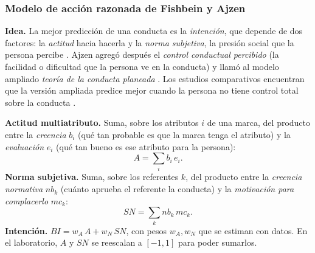 \subsubsection{Modelo de acción razonada de Fishbein y Ajzen}
\label{sec:cap09-fishbein}

\textbf{Idea.} La mejor predicción de una conducta es la \emph{intención}, que
depende de dos factores: la \emph{actitud} hacia hacerla y la \emph{norma
subjetiva}, la presión social que la persona percibe \parencite{fishbein1975}.
Ajzen agregó después el \emph{control conductual percibido} (la facilidad o
dificultad que la persona ve en la conducta) y llamó al modelo ampliado
\emph{teoría de la conducta planeada} \parencite{ajzen1991}. Los estudios
comparativos encuentran que la versión ampliada predice mejor cuando la
persona no tiene control total sobre la conducta \parencite{madden1992}.

\begin{cajaDefinicion}
\textbf{Actitud multiatributo.} Suma, sobre los atributos $i$ de una marca, del
producto entre la \emph{creencia} $b_i$ (qué tan probable es que la marca tenga
el atributo) y la \emph{evaluación} $e_i$ (qué tan bueno es ese atributo para la
persona):
\[
  A = \sum_i b_i\, e_i .
\]
\textbf{Norma subjetiva.} Suma, sobre los referentes $k$, del producto entre la
\emph{creencia normativa} $nb_k$ (cuánto aprueba el referente la conducta) y la
\emph{motivación para complacerlo} $mc_k$:
\[
  SN = \sum_k nb_k\, mc_k .
\]
\textbf{Intención.} $BI = w_A\,A + w_N\,SN$, con pesos $w_A, w_N$ que se
estiman con datos. En el laboratorio, $A$ y $SN$ se reescalan a $[-1,1]$ para
poder sumarlos.
\end{cajaDefinicion}

